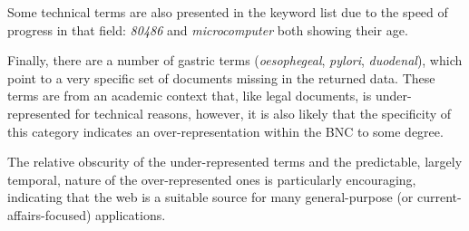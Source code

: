 Some technical terms are also presented in the keyword list due to the speed of progress in that field: \textsl{80486} and \textsl{microcomputer} both showing their age.

Finally, there are a number of gastric terms (\textsl{oesophegeal}, \textsl{pylori}, \textsl{duodenal}), which point to a very specific set of documents missing in the returned data.  These terms are from an academic context that, like legal documents, is under-represented for technical reasons, however, it is also likely that the specificity of this category indicates an over-representation within the BNC to some degree.

The relative obscurity of the under-represented terms and the predictable, largely temporal, nature of the over-represented ones is particularly encouraging, indicating that the web is a suitable source for many general-purpose (or current-affairs-focused) applications.













